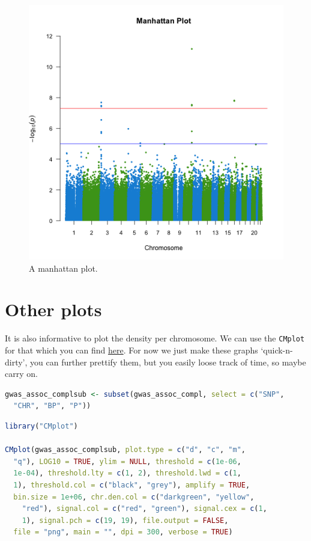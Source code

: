 \documentclass[
]{book}
\newcommand{\passthrough}[1]{#1}
\begin{document}
\begin{figure}[H]

{\centering \includegraphics[width=6.67in]{img/_gwas_dummy/show-manhattan} 

}

\caption{A manhattan plot.}\label{fig:show-manhattan}
\end{figure}

\hypertarget{other-plots}{%
\section{Other plots}\label{other-plots}}

It is also informative to plot the density per chromosome. We can use the \passthrough{\lstinline!CMplot!} for that which you can find \href{https://github.com/YinLiLin/R-CMplot}{here}. For now we just make these graphs `quick-n-dirty', you can further prettify them, but you easily loose track of time, so maybe carry on.

\begin{lstlisting}[language=R]
gwas_assoc_complsub <- subset(gwas_assoc_compl, select = c("SNP",
  "CHR", "BP", "P"))
\end{lstlisting}

\begin{lstlisting}[language=R]
library("CMplot")

CMplot(gwas_assoc_complsub, plot.type = c("d", "c", "m",
  "q"), LOG10 = TRUE, ylim = NULL, threshold = c(1e-06,
  1e-04), threshold.lty = c(1, 2), threshold.lwd = c(1,
  1), threshold.col = c("black", "grey"), amplify = TRUE,
  bin.size = 1e+06, chr.den.col = c("darkgreen", "yellow",
    "red"), signal.col = c("red", "green"), signal.cex = c(1,
    1), signal.pch = c(19, 19), file.output = FALSE,
  file = "png", main = "", dpi = 300, verbose = TRUE)
\end{lstlisting}
\end{document}
